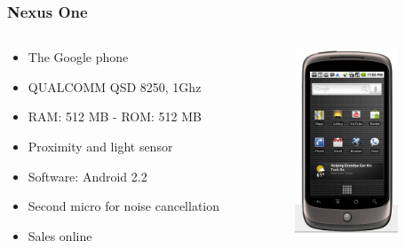 \documentclass{beamer}
\begin{document}
\begin{frame}
\frametitle{Nexus One}

\begin{columns}
\begin{column}{0.5\textwidth}

\begin{itemize}

\item The Google phone
\item QUALCOMM QSD 8250, 1Ghz
\item RAM: 512 MB - ROM: 512 MB
\item Proximity and light sensor
\item Software: Android 2.2
\item Second micro for noise cancellation
\item Sales online
\end{itemize}
\end{column}

\begin{column}{0.5\textwidth}
\begin{center}
  \includegraphics[height=5.5cm]{figs/nexus-one}
\end{center}
\end{column}
\end{columns}
\end{frame}
\end{document}
